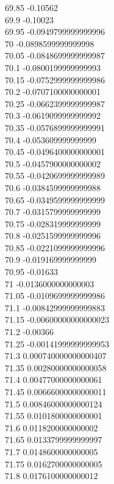 {69.85	-0.10562\\
69.9	-0.10023\\
69.95	-0.0949799999999996\\
70	-0.0898599999999998\\
70.05	-0.0848699999999987\\
70.1	-0.0800199999999993\\
70.15	-0.0752999999999986\\
70.2	-0.0707100000000001\\
70.25	-0.0662399999999987\\
70.3	-0.0619099999999992\\
70.35	-0.0576899999999991\\
70.4	-0.053609999999999\\
70.45	-0.0496400000000001\\
70.5	-0.0457900000000002\\
70.55	-0.0420699999999989\\
70.6	-0.0384599999999988\\
70.65	-0.0349599999999999\\
70.7	-0.0315799999999999\\
70.75	-0.028319999999999\\
70.8	-0.0251599999999996\\
70.85	-0.0221099999999996\\
70.9	-0.019169999999999\\
70.95	-0.01633\\
71	-0.0136000000000003\\
71.05	-0.0109699999999986\\
71.1	-0.00842999999999883\\
71.15	-0.00600000000000023\\
71.2	-0.00366\\
71.25	-0.00141999999999953\\
71.3	0.000740000000000407\\
71.35	0.00280000000000058\\
71.4	0.00477000000000061\\
71.45	0.00666000000000011\\
71.5	0.00846000000000124\\
71.55	0.0101800000000001\\
71.6	0.0118200000000002\\
71.65	0.0133799999999997\\
71.7	0.0148600000000005\\
71.75	0.0162700000000005\\
71.8	0.0176100000000012\\
}
